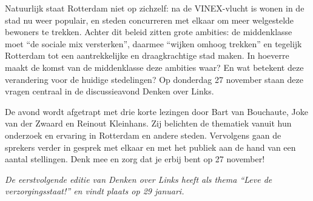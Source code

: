 \documentclass[12pt]{article}
\begin{document}
Natuurlijk staat Rotterdam niet op zichzelf: na de VINEX-vlucht is wonen in de
stad nu weer populair, en steden concurreren met elkaar om meer welgestelde
bewoners te trekken. Achter dit beleid zitten grote ambities: de middenklasse
moet ``de sociale mix versterken'', daarmee ``wijken omhoog trekken'' en tegelijk
Rotterdam tot een aantrekkelijke en draagkrachtige stad maken. In hoeverre
maakt de komst van de middenklasse deze ambities waar? En wat betekent deze
verandering voor de huidige stedelingen? Op donderdag 27 november staan deze
vragen centraal in de discussieavond Denken over Links.

De avond wordt afgetrapt met drie korte lezingen door Bart van Bouchaute, Joke
van der Zwaard en Reinout Kleinhans. Zij belichten de thematiek vanuit hun
onderzoek en ervaring in Rotterdam en andere steden. Vervolgens gaan de
sprekers verder in gesprek met elkaar en met het publiek aan de hand van een
aantal stellingen. Denk mee en zorg dat je erbij bent op 27 november!

\vfill

\emph{De eerstvolgende editie van Denken over Links heeft als thema ``Leve de
verzorgingsstaat!'' en vindt plaats op 29 januari.}

\DolHline
\end{document}
